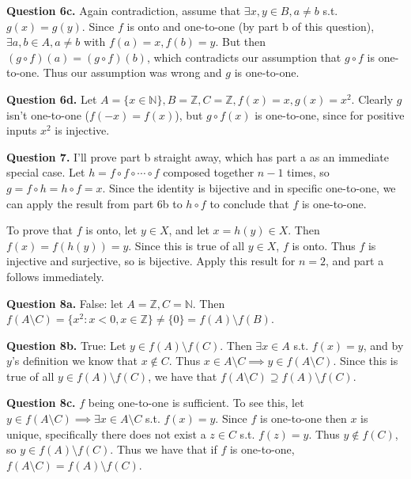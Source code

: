 \documentclass[letterpaper, reqno,11pt]{article}
\begin{document}
{\medskip\noindent\bf Question 6c.} Again contradiction, assume that $\exists x,y\in B, a\neq b$ s.t. $g(x)=g(y)$. Since $f$ is onto and one-to-one (by part b of this question), $\exists a, b\in A, a\neq b$ with $f(a)=x,f(b)=y$. But then $(g\circ f)(a)=(g\circ f)(b)$, which contradicts our assumption that $g\circ f$ is one-to-one. Thus our assumption was wrong and $g$ is one-to-one.

{\medskip\noindent\bf Question 6d.} Let $A=\{x\in \mathbb{N}\}, B= \mathbb{Z}, C=\mathbb{Z}, f(x)=x, g(x)=x^2$. Clearly $g$ isn't one-to-one ($f(-x)=f(x)$), but $g\circ f(x)$ is one-to-one, since for positive inputs $x^2$ is injective.

{\medskip\noindent\bf Question 7.} I'll prove part b straight away, which has part a as an immediate special case. Let $h=f\circ f\circ \cdots\circ f$ composed together $n-1$ times, so $g=f\circ h=h\circ f=x$. Since the identity is bijective and in specific one-to-one, we can apply the result from part 6b to $h\circ f$ to conclude that $f$ is one-to-one. 

To prove that $f$ is onto, let $y\in X$, and let $x=h(y)\in X$. Then $f(x)=f(h(y))=y$. Since this is true of all $y\in X$, $f$ is onto. Thus $f$ is injective and surjective, so is bijective. Apply this result for $n=2$, and part a follows immediately.

{\medskip\noindent\bf Question 8a.} False: let $A=\mathbb{Z},C=\mathbb{N}$. Then $f(A\setminus C)=\{x^2: x<0, x\in \mathbb{Z}\} \neq \{0\} =f(A)\setminus f(B)$.

{\medskip\noindent\bf Question 8b.} True: Let $y\in f(A)\setminus f(C)$. Then $\exists x\in A$ s.t. $f(x)=y$, and by $y$'s definition we know that $x\notin C$. Thus $x\in A\setminus C\implies y\in f(A\setminus C)$. Since this is true of all $y\in f(A)\setminus f(C)$, we have that $f(A\setminus C)\supseteq f(A)\setminus f(C)$.

{\medskip\noindent\bf Question 8c.} $f$ being one-to-one is sufficient. To see this, let $y\in f(A\setminus C)\implies \exists x\in A\setminus C$ s.t. $f(x)=y$. Since $f$ is one-to-one then $x$ is unique, specifically there does not exist a $z\in C$ s.t. $f(z)=y$. Thus $y\notin f(C)$, so $y\in f(A)\setminus f(C)$. Thus we have that if $f$ is one-to-one, $f(A\setminus C)=f(A)\setminus f(C)$.
\end{document}
